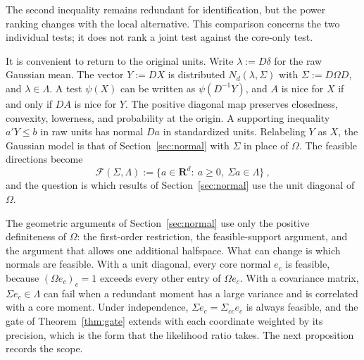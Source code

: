 \documentclass[11pt]{article}
\newcommand{\red}[1]{{\color{red}#1}} %
\numberwithin{equation}{section}
\theoremstyle{definition}
\begin{document}
The second inequality remains redundant for identification, but the power ranking changes with the local alternative. This comparison concerns the two individual tests; it does not rank a joint test against the core-only test.

It is convenient to return to the original units. Write $\lambda:=D\delta$ for the raw Gaussian mean. The vector $Y:=DX$ is distributed $N_d(\lambda,\Sigma)$ with $\Sigma:=D\Omega D$, and $\lambda\in\Lambda$. A test $\psi(X)$ can be written as $\psi(D^{-1}Y)$, \red{and $A$ is nice for $X$ if and only if $DA$ is nice for $Y$. The positive diagonal map preserves closedness, convexity, lowerness, and probability at the origin. A supporting inequality $a'Y\le b$ in raw units has normal $Da$ in standardized units.} Relabeling $Y$ as $X$, the Gaussian model is that of Section~\ref{sec:normal} with $\Sigma$ in place of $\Omega$. The feasible directions become
\[
\mathcal F(\Sigma,\Lambda):=\{a\in\mathbf R^d:\ a\ge0,\ \Sigma a\in\Lambda\}~,
\]
and the question is which results of Section~\ref{sec:normal} use the unit diagonal of $\Omega$.

The geometric arguments of Section~\ref{sec:normal} use only the positive definiteness of $\Omega$: the first-order restriction, the feasible-support argument, and the argument that allows one additional halfspace. What can change is which normals are feasible. With a unit diagonal, every core normal $e_c$ is feasible, because $(\Omega e_c)_c=1$ exceeds every other entry of $\Omega e_c$. With a covariance matrix, $\Sigma e_c\in\Lambda$ can fail when a redundant moment has a large variance and is correlated with a core moment. Under independence, $\Sigma e_c=\Sigma_{cc}e_c$ is always feasible, and the gate of Theorem~\ref{thm:gate} extends with each coordinate weighted by its precision, which is the form that the likelihood ratio takes. The next proposition records the scope.
\end{document}
